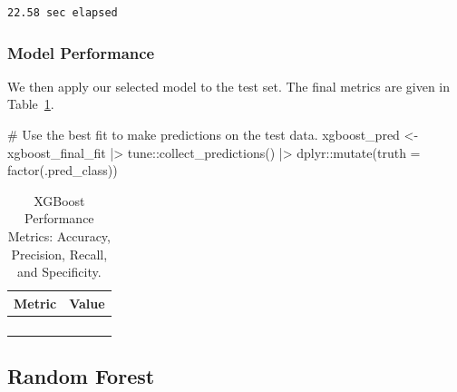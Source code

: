 \documentclass[
  letterpaper,
  DIV=11,
  numbers=noendperiod]{scrartcl}
\newenvironment{Shaded}{\begin{snugshade}}{\end{snugshade}}
\newcommand{\AttributeTok}[1]{\textcolor[rgb]{0.40,0.45,0.13}{#1}}
\newcommand{\CommentTok}[1]{\textcolor[rgb]{0.37,0.37,0.37}{#1}}
\newcommand{\FunctionTok}[1]{\textcolor[rgb]{0.28,0.35,0.67}{#1}}
\newcommand{\NormalTok}[1]{\textcolor[rgb]{0.00,0.23,0.31}{#1}}
\newcommand{\OtherTok}[1]{\textcolor[rgb]{0.00,0.23,0.31}{#1}}
\newcommand{\SpecialCharTok}[1]{\textcolor[rgb]{0.37,0.37,0.37}{#1}}
\begin{document}
\begin{verbatim}
22.58 sec elapsed
\end{verbatim}

\subsubsection{Model Performance}\label{model-performance-4}

We then apply our selected model to the test set. The final metrics are
given in Table~\ref{tbl-xgboost-performance-pdf}.

\begin{Shaded}
\begin{Highlighting}[]
\CommentTok{\# Use the best fit to make predictions on the test data.}
\NormalTok{xgboost\_pred }\OtherTok{\textless{}{-}} 
\NormalTok{  xgboost\_final\_fit }\SpecialCharTok{|\textgreater{}} 
\NormalTok{  tune}\SpecialCharTok{::}\FunctionTok{collect\_predictions}\NormalTok{() }\SpecialCharTok{|\textgreater{}}
\NormalTok{  dplyr}\SpecialCharTok{::}\FunctionTok{mutate}\NormalTok{(}\AttributeTok{truth =} \FunctionTok{factor}\NormalTok{(.pred\_class))}
\end{Highlighting}
\end{Shaded}

\begin{longtable}{>{\raggedright\arraybackslash}p{}>{\raggedleft\arraybackslash}p{}}

\caption{\label{tbl-xgboost-performance-pdf}XGBoost Performance Metrics:
Accuracy, Precision, Recall, and Specificity.}

\tabularnewline

\toprule
Metric & Value \\ 
\midrule\addlinespace[2.5pt]
\cellcolor[HTML]{FFFFFF}{Accuracy} & \cellcolor[HTML]{FFFFFF}{91.2} \\ 
\cellcolor[HTML]{FFFFFF}{Precision} & \cellcolor[HTML]{FFFFFF}{73.1} \\ 
\cellcolor[HTML]{FFFFFF}{Recall} & \cellcolor[HTML]{FFFFFF}{95.0} \\ 
\cellcolor[HTML]{FFFFFF}{Specificity} & \cellcolor[HTML]{FFFFFF}{90.1} \\ 
\bottomrule

\end{longtable}

\subsection{Random Forest}\label{random-forest}
\end{document}
